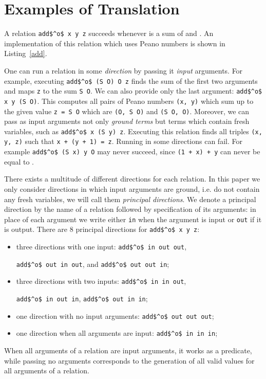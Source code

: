 \section{Examples of Translation}

A relation \lstinline{add$^o$ x y z} succeeds whenever \z is a sum of \x and \y.
An implementation of this relation which uses Peano numbers is shown in Listing~\ref{add}.



One can run a relation in some \emph{direction} by passing it \emph{input} arguments.
For example, executing \lstinline{add$^o$ (S O) O z} finds the sum of the first two arguments and maps \lstinline{z} to the sum \lstinline{S O}.
We can also provide only the last argument: \lstinline{add$^o$ x y (S O)}.
This computes all pairs of Peano numbers \lstinline{(x, y)} which sum up to the given value \lstinline{z = S O} which are \lstinline{(O, S O)} and \lstinline{(S O, O)}.
Moreover, we can pass as input arguments not only \emph{ground terms} but terms which contain fresh variables, such as \lstinline{add$^o$ x (S y) z}.
Executing this relation finds all triples \lstinline{(x, y, z)} such that \lstinline{x + (y + 1) = z}.
Running in some directions can fail.
For example \lstinline{add$^o$ (S x) y O} may never succeed, since \lstinline{(1 + x) + y} can never be equal to \zero.

There exists a multitude of different directions for each relation.
In this paper we only consider directions in which input arguments are ground, i.e. do not contain any fresh variables, we will call them \emph{principal directions}.
We denote a principal direction by the name of a relation followed by specification of its arguments: in place of each argument we write either \lstinline{in} when the argument is input or \lstinline{out} if it is output.
There are $8$ principal directions for \lstinline{add$^o$ x y z}:
\begin{itemize}
  \item three directions with one input: \lstinline{add$^o$ in out out},

  \lstinline{add$^o$ out in out}, and \lstinline{add$^o$ out out in};
  \item three directions with two inputs: \lstinline{add$^o$ in in out},

  \lstinline{add$^o$ in out in}, \lstinline{add$^o$ out in in};
  \item one direction with no input arguments:
  \lstinline{add$^o$ out out out};
  \item one direction when all arguments are input:
  \lstinline{add$^o$ in in in};
\end{itemize}
When all arguments of a relation are input arguments, it works as a predicate, while passing no arguments corresponds to the generation of all valid values for all arguments of a relation.

